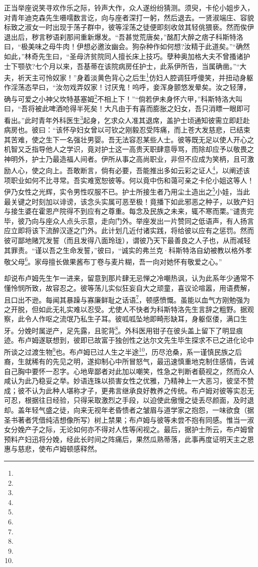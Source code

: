 \par 正当举座说笑寻欢作乐之际，铃声大作，众人遂纷纷猜测。须臾，卡伦小姐步入，对青年迪克森先生嗫嚅数言讫，向与座者深打一躬，然后退去。一贤淑端庄、容貌标致之淑女一时出现于荡子群中，彼等淫荡之徒便即刻收敛其轻佻猥亵。然而俟伊退出后，秽言秽语刹那间重新爆发。“吾甚觉荒唐矣，”酩酊大醉之痞子科斯特洛曰，“极美味之母牛肉！伊想必邀汝幽会。狗杂种作如何想?汝精于此道矣。”“确然如此，”林奇先生曰，“圣母济贫院同人擅长床上技巧。孽种奥加格大夫不曾搔诸护士下颚欤?七个月以来，吾基蒂在该院病房任护士，此系伊所告，当属确凿。”“大夫，祈天主可怜奴家！”身着淡黄色背心之后生\footnote{}仿妇人腔调狂呼傻笑，并扭动身躯作淫荡态早曰，“汝勿戏弄奴家！讨厌鬼！呜呼，妾浑身颤悠发晕矣。汝之轻薄，确与可爱之小神父坎特基塞姆\footnote{}不相上下！”“倘若伊未身怀六甲，”科斯特洛大叫曰，“吾将被此啤酒呛得半死矣！大凡由于有喜而膨胀之妇女，吾只消瞟一眼即可看出。”此时青年外科医生\footnote{}起身，乞求众人准其退席，盖护士顷通知彼需立即赶赴病房也。彼曰：“该怀孕妇女曾以可钦之刚毅忍受阵痛，而上苍大发慈悲，已结束其苦难，使之生下一名强壮男婴。吾无法容忍某些人士。彼等既无足以使人开心之机智又乏指导他人之学识，竟对护士这一高贵天职肆意辱骂，而除却应予以敬畏之神明外，护士乃最造福人间者。伊所从事之高尚职业，非但不应成为笑柄，且可激励人心，使之向上。吾敢断言，倘有必要，吾能推出多如云彩之证人\footnote{}，以阐述该项职业如何不比寻常。吾实难宽恕彼等。何以竟中伤和蔼可亲之卡伦小姐这等人！伊乃女性之光辉，实令男性叹服不已。护士所接生者乃用尘土造出之\footnote{}小娃，当此最关键之时刻加以诽谤，该念头实属可恶至极！竟播下如此邪恶之种子，以致产妇与接生婆在霍恩产院得不到应有之尊重。每念及民族之未来，辄不寒而栗。”谴责完毕，彼乃向与座众人点头示意，走向门外。举座发出一片赞同之低语声，有人扬言应立即将该下流醉汉逐之门外。此计划几近付诸实践，将给彼以应有之惩罚。然而彼可鄙地赌咒发誓（而且发得八面玲珑），谓彼乃天下最善良之人子也，从而减轻其罪责。“谨以吾之生命发誓，”彼曰，“诚实的弗兰克·科斯特洛自幼被教以格外孝敬父母\footnote{}。家母擅长做果酱布丁卷与麦片糊，吾一向对她怀有敬爱之心。”
\par 却说布卢姆先生乍一进来，留意到那片肆无忌惮之冷嘲热讽，认为此系年少通常不懂怜悯所致，故容忍之。彼等荡儿实似狂妄自大之顽童，喜议论喧嚣，用语费解，且口出不逊。每闻其暴躁与寡廉鲜耻之话语\footnote{}，顿感愤慨。虽能以血气方刚勉强为之开脱，但如此无礼实难以忍受。尤使人不快者为科斯特洛先生言辞之粗野。据观察，此令人作呕之流氓乃私生子耳。彼呱呱坠地即畸形缺耳，身躯伛偻，满口生牙。分娩时属逆产，足先露，且驼背\footnote{}。外科医用钳子在彼头盖上留下了明显痕迹。布卢姆遂联想到，彼即已故富于独创性之达尔文先生毕生探求不已之进化论中所谈之过渡生物\footnote{}也。布卢姆已过人生之半途\footnote{}，历尽沧桑，系一谨慎民族之后裔，生就稀有的先见之明，遂抑制心中所冒怒气，最迅速慎重地克制住感情，告诫自己胸中要怀一忍字。心地卑鄙者对此加以嘲笑，性急之判断者藐视之，然而众人咸认为此乃稳妥之举。妙语连珠以损害女性之优雅，乃精神上一大恶习，彼坚不赞成；彼不认为此种人堪称才子，更弗言继承良好教养之传统。布卢姆对彼等实忍无可忍，根据往日经验，只得采取激烈之手段，以迫使此傲慢之徒丢尽颜面，及时退却。盖年轻气盛之徒，向来无视年老昏愦者之皱眉与道学家之抱怨，一味欲食（据圣书著者凭借纯洁想像所写）树上禁果；布卢姆与彼等未尝不抱有同感。惟当一淑女分娩产子之际，无论如何亦不得对人性等闲视之。最后，据护士所云，布卢姆曾预料产妇迅将分娩，经此长时间之阵痛后，果然瓜熟蒂落，此事再度证明天主之恩惠与慈悲，使布卢姆顿感释然。
